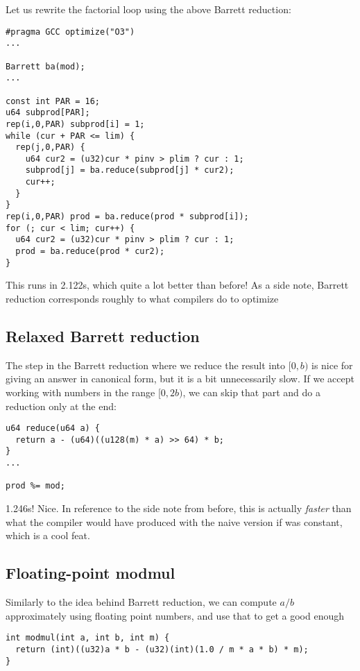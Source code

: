 Let us rewrite the factorial loop using the above Barrett reduction:
\begin{lstlisting}
#pragma GCC optimize("O3")
...

Barrett ba(mod);
...

const int PAR = 16;
u64 subprod[PAR];
rep(i,0,PAR) subprod[i] = 1;
while (cur + PAR <= lim) {
  rep(j,0,PAR) {
    u64 cur2 = (u32)cur * pinv > plim ? cur : 1;
    subprod[j] = ba.reduce(subprod[j] * cur2);
    cur++;
  }
}
rep(i,0,PAR) prod = ba.reduce(prod * subprod[i]);
for (; cur < lim; cur++) {
  u64 cur2 = (u32)cur * pinv > plim ? cur : 1;
  prod = ba.reduce(prod * cur2);
}
\end{lstlisting}
This runs in 2.122s, which quite a lot better than before!
As a side note, Barrett reduction corresponds roughly to what compilers do to optimize \verb@a % b@ where \verb@b@ is a compile-time constant.

\subsection{Relaxed Barrett reduction}
The step in the Barrett reduction where we reduce the result into $[0, b)$ is nice for giving an answer in canonical form, but it is a bit unnecessarily slow.
If we accept working with numbers in the range $[0, 2b)$, we can skip that part and do a reduction only at the end:
\begin{lstlisting}
u64 reduce(u64 a) {
  return a - (u64)((u128(m) * a) >> 64) * b;
}
...

prod %= mod;
\end{lstlisting}
1.246s! Nice.
In reference to the side note from before, this is actually \emph{faster} than what the compiler would have produced with the naive version if \verb@mod@ was constant, which is a cool feat.

\subsection{Floating-point modmul}

Similarly to the idea behind Barrett reduction, we can compute $a / b$ approximately using floating point numbers, and use that to get a good enough \verb@a % b@, in the range $(-(1+\epsilon)b, (1+\epsilon)b)$. We combine multiplication and reduction in order to keep to 32-bit integers, making use of integer overflow:

\begin{lstlisting}
int modmul(int a, int b, int m) {
  return (int)((u32)a * b - (u32)(int)(1.0 / m * a * b) * m);
}
\end{lstlisting}

